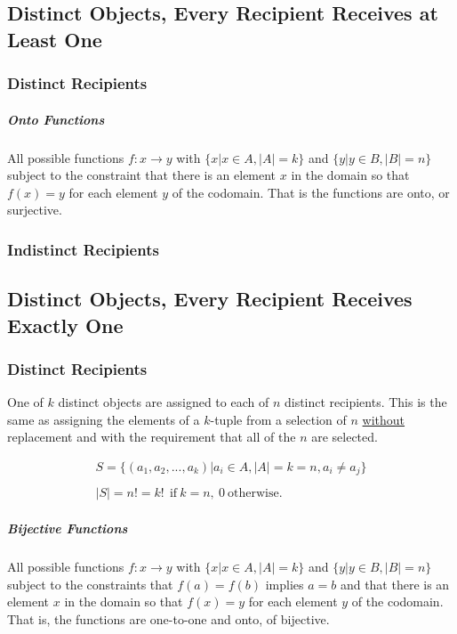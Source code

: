 \subsection{Distinct Objects, Every Recipient Receives at Least One}

\subsubsection{Distinct Recipients}

\subparagraph{Onto Functions} All possible functions $f:x \rightarrow y$ with $\{x | x\in A, |A| = k \}$ and $\{y | y\in B, |B| = n\}$ subject to the constraint that there is an element $x$ in the domain so that $f(x)=y$ for each element $y$ of the codomain. That is the functions are onto, or surjective.
\subsubsection{Indistinct Recipients}

\subsection{Distinct Objects, Every Recipient Receives Exactly One}

\subsubsection{Distinct Recipients}
One of $k$ distinct objects are assigned to each of $n$ distinct recipients. This is the same as assigning the elements of a $k$-tuple from a selection of $n$ \underline{without} replacement and with the requirement that all of the $n$ are selected.

\begin{equation}	
\begin{array}{l}
S = \{ (a_1,a_2,...,a_k) | a_i \in A, |A| = k = n, a_i\neq a_j\}\\
\\
|S| = n! = k!\ \ \mathrm{if\ }k=n,\ 0\ \mathrm{otherwise.}
\end{array}
\end{equation}

\subparagraph{Bijective Functions} All possible functions $f:x \rightarrow y$ with $\{x | x\in A, |A| = k \}$ and $\{y | y\in B, |B| = n\}$ subject to the constraints that $f(a) = f(b)$ implies $a=b$ and that there is an element $x$ in the domain so that $f(x)=y$ for each element $y$ of the codomain. That is, the functions are one-to-one and onto, of bijective.

